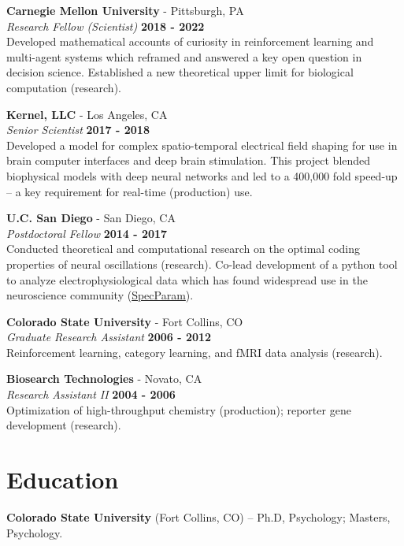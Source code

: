 \documentclass[margin,line]{res}
\begin{document}
\begin{resume}
\vspace{-.1cm}
{\bf Carnegie Mellon University} - Pittsburgh, PA \\
{\em Research Fellow (Scientist)} \hfill {\bf 2018 - 2022}\\
Developed mathematical accounts of curiosity in reinforcement learning and multi-agent systems which reframed and answered a key open question in decision science. Established a new theoretical upper limit for biological computation (research). 

\vspace{-.1cm}
{\bf Kernel, LLC} - Los Angeles, CA\\
{\em Senior Scientist} \hfill {\bf 2017 - 2018}\\
Developed a model for complex spatio-temporal electrical field shaping for use in brain computer interfaces and deep brain stimulation. This project blended biophysical models with deep neural networks and led to a 400,000 fold speed-up -- a key requirement for real-time (production) use.

\vspace{-.1cm}
{\bf U.C. San Diego} - San Diego, CA\\
{\em Postdoctoral Fellow} \hfill {\bf 2014 - 2017}\\
Conducted theoretical and computational research on the optimal coding properties of neural oscillations (research). Co-lead development of a python tool to analyze electrophysiological data which has found widespread use in the neuroscience community (\href{https://github.com/fooof-tools/fooof}{SpecParam}).

\vspace{-.1cm}
{\bf Colorado State University} - Fort Collins, CO\\
{\em Graduate Research Assistant} \hfill {\bf 2006 - 2012}\\
Reinforcement learning, category learning, and fMRI data analysis (research). 

\vspace{-.1cm}
{\bf Biosearch Technologies} - Novato, CA\\
{\em Research Assistant II} \hfill {\bf 2004 - 2006}\\
Optimization of high-throughput chemistry (production); reporter gene development (research).

\vspace{-.2cm}
\section{\sc Education}
{\bf Colorado State University} (Fort Collins, CO) --  Ph.D, Psychology; Masters, Psychology.\\
\vspace*{-.15in}


\end{resume}
\end{document}

